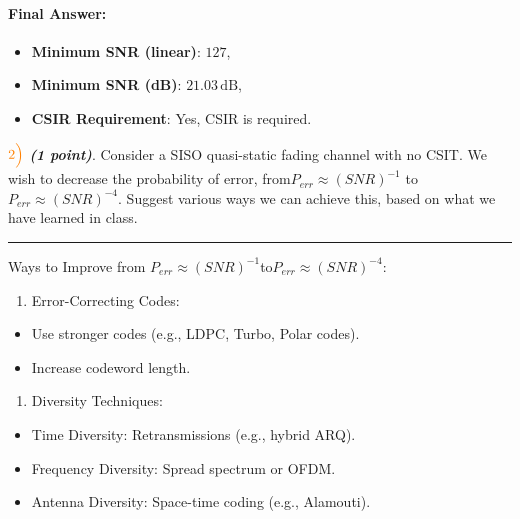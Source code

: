 \documentclass[11pt]{article}
\providecommand{\tightlist}{%
      \setlength{\itemsep}{0pt}\setlength{\parskip}{0pt}}
\begin{document}
\paragraph{Final Answer:}\label{final-answer}

\begin{itemize}
\tightlist
\item
  \textbf{Minimum SNR (linear)}: \(127\),
\item
  \textbf{Minimum SNR (dB)}: \(21.03 \, \text{dB}\),
\item
  \textbf{CSIR Requirement}: Yes, CSIR is required.
\end{itemize}

    \(\color{orange}2\Bigl)\) \textbf{\emph{(1 point)}}. Consider a SISO
quasi-static fading channel with no CSIT. We wish to decrease the
probability of error, from\(P_{err} \approx (SNR)^{−1}\) to
\(P_{err} \approx (SNR)^{−4}\). Suggest various ways we can achieve
this, based on what we have learned in class.

    \begin{center}\rule{0.5\linewidth}{0.5pt}\end{center}

Ways to Improve from
\(P_{err} \approx (SNR)^{−1}\)to\(P_{err} \approx (SNR)^{−4}\):

\begin{enumerate}
\def\labelenumi{\arabic{enumi}.}
\tightlist
\item
  Error-Correcting Codes:
\end{enumerate}

\begin{itemize}
\tightlist
\item
  Use stronger codes (e.g., LDPC, Turbo, Polar codes).
\item
  Increase codeword length.
\end{itemize}

\begin{enumerate}
\def\labelenumi{\arabic{enumi}.}
\setcounter{enumi}{1}
\tightlist
\item
  Diversity Techniques:
\end{enumerate}

\begin{itemize}
\tightlist
\item
  Time Diversity: Retransmissions (e.g., hybrid ARQ).
\item
  Frequency Diversity: Spread spectrum or OFDM.
\item
  Antenna Diversity: Space-time coding (e.g., Alamouti).
\end{itemize}
\end{document}

